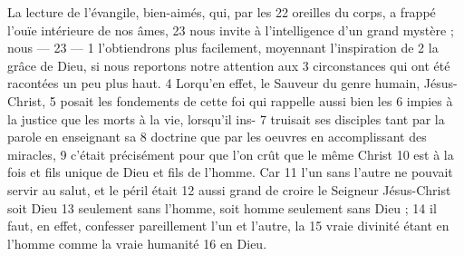 La lecture de l'évangile, bien-aimés, qui, par les	 
22	 	oreilles du corps, a frappé l'ouïe intérieure de nos âmes,	 
23	 	nous invite à l'intelligence d'un grand mystère ; nous	 
 	--- 23 ---	 
1	 	l'obtiendrons plus facilement, moyennant l'inspiration de	 
2	 	la grâce de Dieu, si nous reportons notre attention aux	 
3	 	circonstances qui ont été racontées un peu plus haut.	 
4	 	Lorqu'en effet, le Sauveur du genre humain, Jésus-Christ,	 
5	 	posait les fondements de cette foi qui rappelle aussi bien les	 
6	 	impies à la justice que les morts à la vie, lorsqu'il ins-	 
7	 	truisait ses disciples tant par la parole en enseignant sa	 
8	 	doctrine que par les oeuvres en accomplissant des miracles,	 
9	 	c'était précisément pour que l'on crût que le même Christ	 
10	 	est à la fois et fils unique de Dieu et fils de l'homme. Car	 
11	 	l'un sans l'autre ne pouvait servir au salut, et le péril était	 
12	 	aussi grand de croire le Seigneur Jésus-Christ soit Dieu	 
13	 	seulement sans l'homme, soit homme seulement sans Dieu ;	 
14	 	il faut, en effet, confesser pareillement l'un et l'autre, la	 
15	 	vraie divinité étant en l'homme comme la vraie humanité	 
16	 	en Dieu.